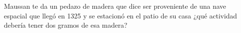 \documentclass[./../main.tex]{subfiles}
\begin{document}
	\begin{exercise}
		Maussan te da un pedazo de madera que dice ser proveniente de una nave espacial que llegó en 1325 y se estacionó en el patio de su casa ¿qué actividad debería tener dos gramos de esa madera?
	\end{exercise}
\end{document}
